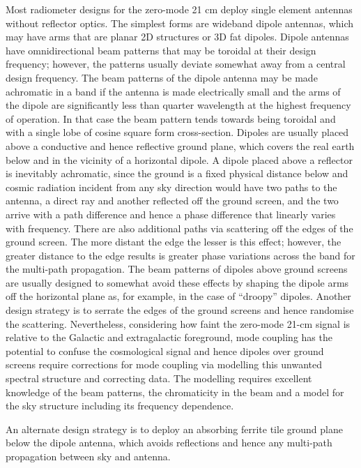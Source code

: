    Most radiometer designs for the zero-mode 21 cm deploy single element antennas without reflector optics.  The simplest forms are wideband dipole antennas, which may have arms that are planar 2D structures or 3D fat dipoles.  Dipole antennas have omnidirectional beam patterns that may be toroidal at their design frequency; however, the patterns usually deviate somewhat away from a central design frequency.  The beam patterns of the dipole antenna may be made achromatic in a band if the antenna is made electrically small and the arms of the dipole are significantly less than quarter wavelength at the highest frequency of operation.  In that case the beam pattern tends towards being toroidal and with a single lobe of cosine square form cross-section.  Dipoles are usually placed above a conductive and hence reflective ground plane, which covers the real earth below and in the vicinity of a horizontal dipole.  A dipole placed above a reflector is inevitably achromatic, since the ground is a fixed physical distance below and cosmic radiation incident from any sky direction would have two paths to the antenna, a direct ray and another reflected off the ground screen, and the two arrive with a path difference and hence a phase difference that linearly varies with frequency.  There are also additional paths via scattering off the edges of the ground screen. The more distant the edge the lesser is this effect; however, the greater distance to the edge results is greater phase variations across the band for the multi-path propagation.  The beam patterns of dipoles above ground screens are usually designed to somewhat avoid these effects by shaping the dipole arms off the horizontal plane as, for example, in the case of ``droopy'' dipoles.  Another design strategy is to serrate the edges of the ground screens and hence randomise the scattering. Nevertheless, considering how faint the zero-mode 21-cm signal is relative to the Galactic and extragalactic foreground, mode coupling has the potential to confuse the cosmological signal and hence dipoles over ground screens require corrections for mode coupling via modelling this unwanted spectral structure and correcting data.  The modelling requires excellent knowledge of the beam patterns, the chromaticity in the beam and a model for the sky structure including its frequency dependence.
   
   An alternate design strategy is to deploy an absorbing ferrite tile ground plane below the dipole antenna, which avoids reflections and hence any multi-path propagation between sky and antenna. 
   
